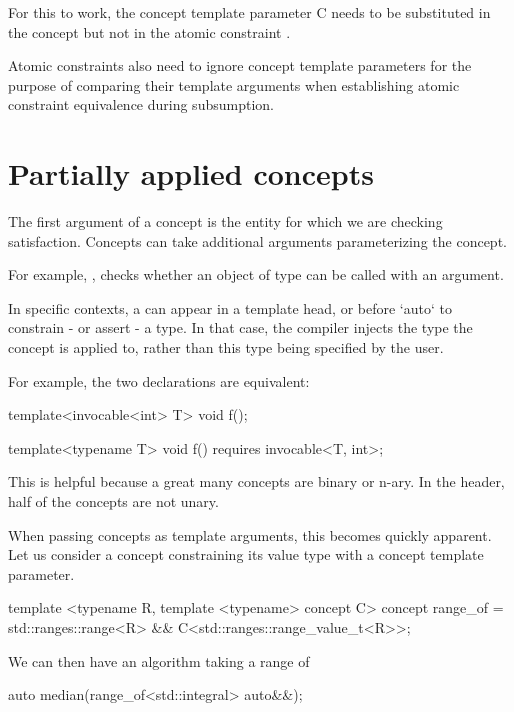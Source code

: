 \documentclass{wg21}
\begin{document}
For this to work, the concept template parameter C needs to be substituted
in the concept  but not in the atomic constraint
.

Atomic constraints also need to ignore concept template parameters for the purpose
of comparing their template arguments when establishing atomic constraint equivalence during subsumption.


\section{Partially applied concepts}

The first argument of a concept is the entity for which we are checking satisfaction.
Concepts can take additional arguments parameterizing the concept.

For example, , checks whether an object of type  can be called
with an  argument.

In specific contexts, a  can appear in a template head, or before `auto` to constrain - or assert -
a type. In that case, the compiler injects the type the concept is applied to, rather than this type being specified by the user.

For example, the two declarations are equivalent:

\begin{colorblock}
template<invocable<int> T>
void f();

template<typename T>
void f() requires invocable<T, int>;
\end{colorblock}

This is helpful because a great many concepts are binary or n-ary.
In the  header, half of the concepts are not unary.


When passing concepts as template arguments, this becomes quickly apparent.
Let us consider a  concept constraining its value type with a concept template parameter.

\begin{colorblock}
template <typename R, template <typename> concept C>
concept range_of = std::ranges::range<R> && C<std::ranges::range_value_t<R>>;
\end{colorblock}

We can then have an algorithm taking a range of 

\begin{colorblock}
auto median(range_of<std::integral> auto&&);
\end{colorblock}
\end{document}
